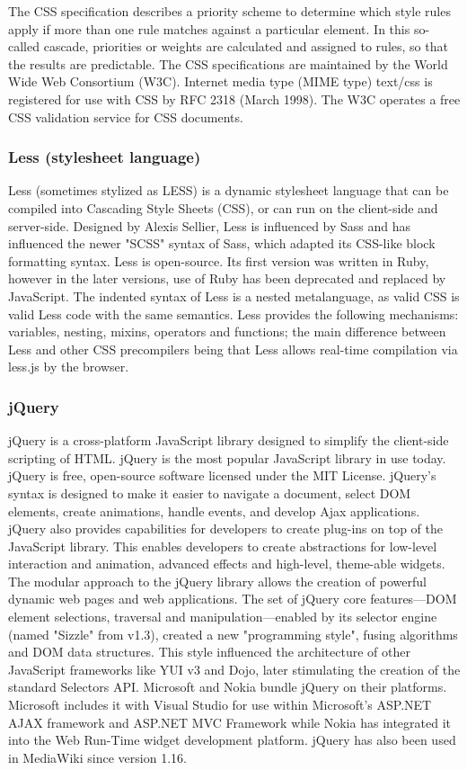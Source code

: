 The CSS specification describes a priority scheme to determine which style rules apply if more than one rule matches against a particular element. In this so-called cascade, priorities or weights are calculated and assigned to rules, so that the results are predictable.
The CSS specifications are maintained by the World Wide Web Consortium (W3C). Internet media type (MIME type) text/css is registered for use with CSS by RFC 2318 (March 1998). The W3C operates a free CSS validation service for CSS documents.

\subsubsection{Less (stylesheet language)}
Less (sometimes stylized as LESS) is a dynamic stylesheet language that can be compiled into Cascading Style Sheets (CSS), or can run on the client-side and server-side. Designed by Alexis Sellier, Less is influenced by Sass and has influenced the newer "SCSS" syntax of Sass, which adapted its CSS-like block formatting syntax. Less is open-source. Its first version was written in Ruby, however in the later versions, use of Ruby has been deprecated and replaced by JavaScript. The indented syntax of Less is a nested metalanguage, as valid CSS is valid Less code with the same semantics. Less provides the following mechanisms: variables, nesting, mixins, operators and functions; the main difference between Less and other CSS precompilers being that Less allows real-time compilation via less.js by the browser.
\subsubsection{jQuery}
jQuery is a cross-platform JavaScript library designed to simplify the client-side scripting of HTML. jQuery is the most popular JavaScript library in use today. jQuery is free, open-source software licensed under the MIT License.
jQuery's syntax is designed to make it easier to navigate a document, select DOM elements, create animations, handle events, and develop Ajax applications. jQuery also provides capabilities for developers to create plug-ins on top of the JavaScript library. This enables developers to create abstractions for low-level interaction and animation, advanced effects and high-level, theme-able widgets. The modular approach to the jQuery library allows the creation of powerful dynamic web pages and web applications.
The set of jQuery core features—DOM element selections, traversal and manipulation—enabled by its selector engine (named "Sizzle" from v1.3), created a new "programming style", fusing algorithms and DOM data structures. This style influenced the architecture of other JavaScript frameworks like YUI v3 and Dojo, later stimulating the creation of the standard Selectors API.
Microsoft and Nokia bundle jQuery on their platforms. Microsoft includes it with Visual Studio for use within Microsoft's ASP.NET AJAX framework and ASP.NET MVC Framework while Nokia has integrated it into the Web Run-Time widget development platform. jQuery has also been used in MediaWiki since version 1.16.
